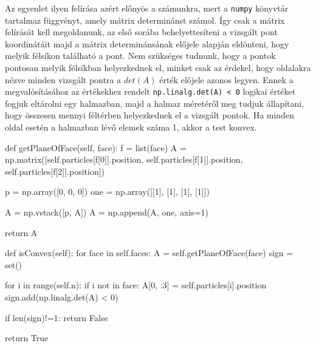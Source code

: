 Az egyenlet ilyen felírása azért előnyös a számunkra, mert a \texttt{numpy} könyvtár tartalmaz függvényt, amely mátrix determinánst számol.
Így csak a mátrix felírását kell megoldanunk, az első sorába behelyettesíteni a vizsgált pont koordinátáit majd a mátrix determinánsának előjele alapján eldönteni, hogy melyik félsíkon található a pont.
Nem szükséges tudnunk, hogy a pontok pontosan melyik félsíkban helyezkednek el, minket csak az érdekel, hogy oldalakra nézve minden vizsgált pontra a $det(A)$ érték előjele azonos legyen.
Ennek a megvalósításához az értékekhez rendelt \texttt{np.linalg.det(A) < 0} logikai értéket fogjuk eltárolni egy halmazban, majd a halmaz méretéről meg tudjuk állapítani, hogy összesen mennyi féltérben helyezkednek el a vizsgált pontok.
Ha minden oldal esetén a halmazban lévő elemek száma 1, akkor a test konvex.
\begin{python}
def getPlaneOfFace(self, face):
    f = list(face)
    A = np.matrix([self.particles[f[0]].position,
                   self.particles[f[1]].position,
                   self.particles[f[2]].position])

    p = np.array([0, 0, 0])
    one = np.array([[1], [1], [1], [1]])

    A = np.vstack([p, A])
    A = np.append(A, one, axis=1)

    return A

def isConvex(self):
    for face in self.faces:
        A = self.getPlaneOfFace(face)
        sign = set()

        for i in range(self.n):
            if i not in face:
                A[0, :3] = self.particles[i].position
                sign.add(np.linalg.det(A) < 0)

        if len(sign)!=1:
            return False

    return True
\end{python}

